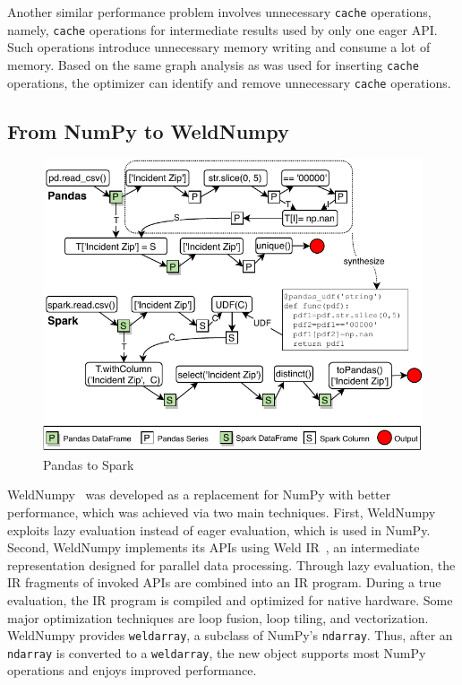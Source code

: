 \documentclass[sigconf]{acmart}\settopmatter{printfolios=true,printccs=false,printacmref=false}\setcopyright{none}
\begin{document}
Another similar performance problem involves unnecessary \texttt{cache} operations, namely, \texttt{cache} operations for intermediate results used by only one eager API. Such operations introduce unnecessary memory writing and consume a lot of memory. Based on the same graph analysis as was used for inserting \texttt{cache} operations, the optimizer can identify and remove unnecessary \texttt{cache} operations.

\subsection{From NumPy to WeldNumpy}

\label{sec:weldnumpy}

\begin{figure}[!ht]
    \centering
    \includegraphics[width=\columnwidth]{figure/dataframe.pdf}
    \caption{Pandas to Spark}
    \label{fig:dataframe}
\end{figure}

WeldNumpy~\cite{WeldNumpy} was developed as a replacement for NumPy with better performance, which was achieved via two main techniques. First, WeldNumpy exploits lazy evaluation instead of eager evaluation, which is used in NumPy. Second, WeldNumpy implements its APIs using Weld IR~\cite{palkar2017weld}, an intermediate representation designed for parallel data processing. Through lazy evaluation, the IR fragments of invoked APIs are combined into an IR program. During a true evaluation, the IR program is compiled and optimized for native hardware. Some major optimization techniques are loop fusion, loop tiling, and vectorization. WeldNumpy provides \texttt{weldarray}, a subclass of NumPy's \texttt{ndarray}. Thus, after an \texttt{ndarray} is converted to a \texttt{weldarray}, the new object supports most NumPy operations and enjoys improved performance.
\end{document}
